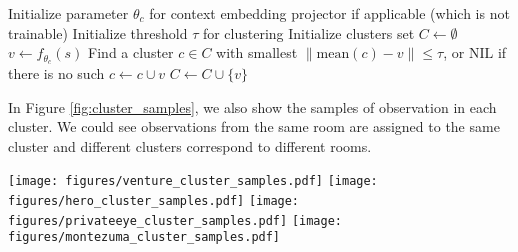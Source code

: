\documentclass{article} \usepackage{iclr,times}
\begin{document}
{\begin{algorithm}
\begin{algorithmic}
\STATE Initialize parameter $\theta_c$ for context embedding projector if applicable (which is not trainable)
\STATE Initialize threshold $\tau$ for clustering
\STATE Initialize clusters set $C \gets  \emptyset$
\STATE $v \gets f_{\theta_c}(s)$
\STATE Find a cluster $c \in C$ with smallest $\| \mathrm{mean}(c) - v \| \le \tau$, or $\mathrm{NIL}$ if there is no such
	    \STATE $c \gets c \cup v$
	\ELSE
\STATE $C \gets C \cup \{ v \}$
	\ENDIF
\ENDFOR
\end{algorithmic}
\caption{Observation Embedding Clustering}
\label{alg:clustering}
\end{algorithm}

In Figure \ref{fig:cluster_samples}, we also show the samples of observation in each cluster.
We could see observations from the same room are assigned to the same cluster and different clusters correspond to different rooms.
\begin{figure*}[bt] \begin{center}
\texttt{[image: figures/venture\_cluster\_samples.pdf]}
    \vspace*{-0.3cm}
    \texttt{[image: figures/hero\_cluster\_samples.pdf]}
    \vspace*{-0.3cm}
    \texttt{[image: figures/privateeye\_cluster\_samples.pdf]}
    \vspace*{-0.3cm}
    \texttt{[image: figures/montezuma\_cluster\_samples.pdf]}
    
    \vspace*{0.3cm}
    \caption{
        Sample of clustering results for \Venture, \Hero, \PrivateEye, and \MontezumaRevenge. Each column is one cluster, and we show 3 random samples assigned into this cluster.
    }
    \label{fig:cluster_samples}
\end{center} \end{figure*}

\clearpage

























}
\end{document}

